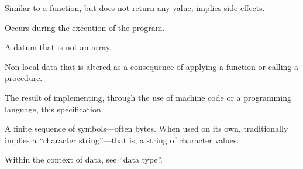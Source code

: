 \begin{description}
  Similar to a function, but does not return any value; implies side-effects.

  Occurs during the execution of the program.

  A datum that is not an array.

  Non-local data that is altered as a consequence of applying a function or
  calling a procedure.

  The result of implementing, through the use of machine code or a programming
  language, this specification.

  A finite sequence of symbols---often bytes. When used on its own,
  traditionally implies a ``character string''---that is, a string of character
  values.

  Within the context of data, see ``data type''.
\end{description}
